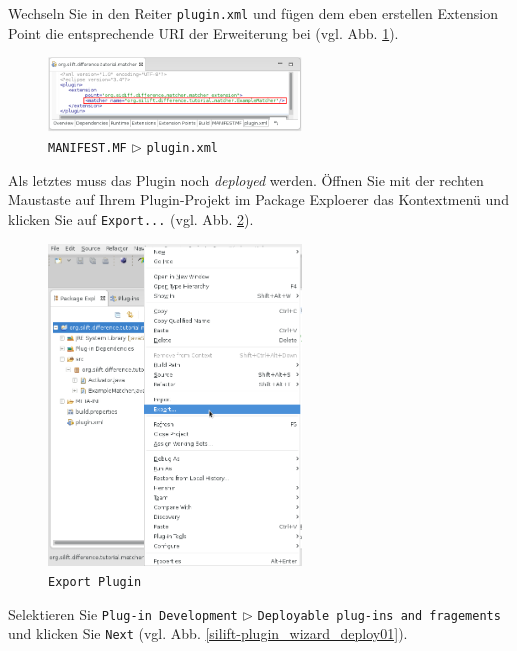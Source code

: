 Wechseln Sie in den Reiter \texttt{plugin.xml} und fügen dem eben erstellen Extension Point die entsprechende URI der Erweiterung bei (vgl. Abb. \ref{silift-plugin_matcher_manifest_plugin}).

\begin{figure}[H]
\centering
\includegraphics[width=0.6\textwidth]{matching/graphics/silift-plugin_matcher_manifest_plugin.png}
\caption{\texttt{MANIFEST.MF} $\triangleright$ \texttt{plugin.xml}}
\label{silift-plugin_matcher_manifest_plugin}
\end{figure}

Als letztes muss das Plugin noch \textit{deployed} werden.
Öffnen Sie mit der rechten Maustaste auf Ihrem Plugin-Projekt im Package Exploerer das Kontextmenü und klicken Sie auf \texttt{Export...} (vgl. Abb. \ref{silift-plugin_contextmenu_export}).

\begin{figure}[H]
\centering
\includegraphics[width=0.6\textwidth]{matching/graphics/silift-plugin_contextmenu_export.png}
\caption{\texttt{Export Plugin}}
\label{silift-plugin_contextmenu_export}
\end{figure}

Selektieren Sie \texttt{Plug-in Development} $\triangleright$ \texttt{Deployable plug-ins and fragements} und klicken Sie \texttt{Next} (vgl. Abb. \ref{silift-plugin_wizard_deploy01}).

